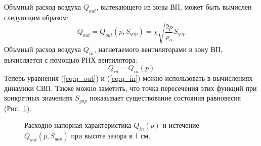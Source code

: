 Объмный расход воздуха $Q_{out}$, вытекающего из зоны ВП, может быть вычислен следующим образом:
\begin{equation}\label{eq:q_out}
    Q_{out}=Q_{out}(p, S_{gap})=\chi\sqrt{\dfrac{2p}{\rho_{a}}}S_{gap}
\end{equation}
Объмный расход воздуха $Q_{in}$, нагнетаемого вентиляторами в зону ВП, вычисляется с помощью РНХ вентилятора:
\begin{equation}\label{eq:q_in}
    Q_{in}=Q_{in}(p)
\end{equation}
Теперь уравнения (\ref{eq:q_out}) и (\ref{eq:q_in}) можно использовать в вычислениях динамики СВП. Также можно заметить, что точка пересечения этих функций при конкретных значениях $S_{gap}$ показывает существование состояния равновесия (Рис.~\ref{fig:compare_in_out}).

\begin{figure}[!h]
    \centering
    
    \caption{Расходно напорная характеристика $Q_{in}(p)$ и истечение $Q_{out}(p, S_{gap})$ при высоте зазора в 1 см.}\label{fig:compare_in_out}
\end{figure}